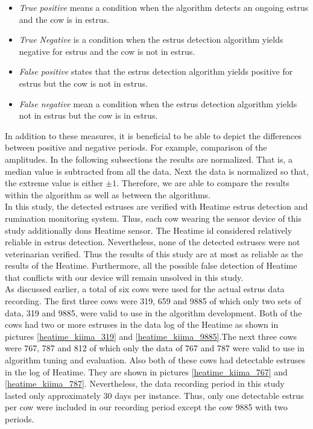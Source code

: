 \documentclass[english,12pt,a4paper,pdftex,elec,utf8]{aaltothesis}
\begin{document}
\begin{itemize}
\item \textit{True positive} means a condition when the algorithm detects an ongoing estrus and the cow is in estrus.
\item \textit{True Negative} is a condition when the estrus detection algorithm yields negative for estrus and the cow is not in estrus.
\item \textit{False positive} states that the estrus detection algorithm yields positive for estrus but the cow is not in estrus.
\item \textit{False negative} mean a condition when the estrus detection algorithm yields not in estrus but the cow is in estrus.
\end{itemize}

In addition to these measures, it is beneficial to be able to depict the differences between positive and negative periods. For example, comparison of the amplitudes. In the following subsections the results are normalized. That is, a median value is subtracted from all the data. Next the data is normalized so that, the extreme value is either $\pm1$. Therefore, we are able to compare the results within the algorithm as well as between the algorithms. \\
In this study, the detected estruses are verified with Heatime estrus detection and rumination monitoring system. Thus, each cow wearing the sensor device of this study additionally dons Heatime sensor. The Heatime id considered relatively reliable in estrus detection. Nevertheless, none of the detected estruses were not veterinarian verified. Thus the results of this study are at most as reliable as the results of the Heatime. Furthermore, all the possible false detection of Heatime that conflicts with our device will remain unsolved in this study. \\
As discussed earlier, a total of six cows were used for the actual estrus data recording. The first three cows were 319, 659 and 9885 of which only two sets of data, 319 and 9885, were valid to use in the algorithm development. Both of the cows had two or more estruses in the data log of the Heatime as shown in pictures \ref{heatime_kiima_319} and \ref{heatime_kiima_9885}.The next three cows were 767, 787 and 812 of which only the data of 767 and 787 were valid to use in algorithm tuning and evaluation. Also both of these cows had detectable estruses in the log of Heatime. They are shown in pictures \ref{heatime_kiima_767} and \ref{heatime_kiima_787}. Nevertheless, the data recording period in this study lasted only approximately 30 days per instance. Thus, only one detectable estrus per cow were included in our recording period except the cow 9885 with two periods.
\end{document}

